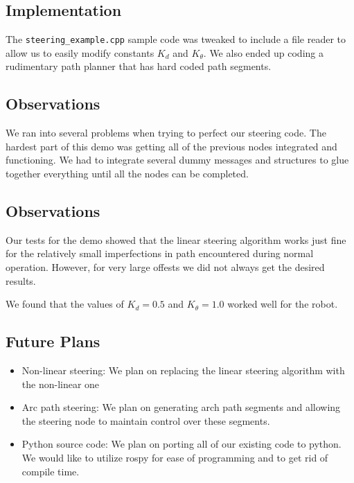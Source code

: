 \subsection{Implementation}

The \texttt{steering\_example.cpp} sample code was tweaked to include a
file reader to allow us to easily modify constants $K_d$ and $K_\theta$.
We also ended up coding a rudimentary path planner that has hard coded
path segments.

\subsection{Observations}

We ran into several problems when trying to perfect our steering code.
The hardest part of this demo was getting all of the previous nodes
integrated and functioning. We had to integrate several dummy messages
and structures to glue together everything until all the nodes can be
completed.

\subsection{Observations}

Our tests for the demo showed that the linear steering algorithm works
just fine for the relatively small imperfections in path encountered
during normal operation. However, for very large offests we did not
always get the desired results.

We found that the values of $K_d=0.5$ and $K_\theta = 1.0$ worked well
for the robot.

\subsection{Future Plans}

\begin{itemize}
\item
  Non-linear steering: We plan on replacing the linear steering
  algorithm with the non-linear one
\item
  Arc path steering: We plan on generating arch path segments and
  allowing the steering node to maintain control over these segments.
\item
  Python source code: We plan on porting all of our existing code to
  python. We would like to utilize rospy for ease of programming and to
  get rid of compile time.
\end{itemize}
